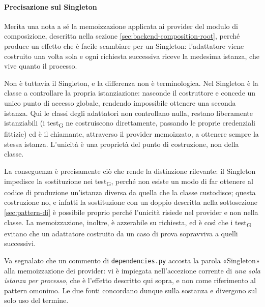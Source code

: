 \documentclass[a4paper, 10pt]{article}
\begin{document}
\paragraph{Precisazione sul Singleton}
Merita una nota a sé la memoizzazione applicata ai provider del modulo di composizione, descritta nella sezione \ref{sec:backend-composition-root}, perché produce un effetto che è facile scambiare per un Singleton: l'adattatore viene costruito una volta sola e ogni richiesta successiva riceve la medesima istanza, che vive quanto il processo.

Non è tuttavia il Singleton, e la differenza non è terminologica. Nel Singleton è la classe a controllare la propria istanziazione: nasconde il costruttore e concede un unico punto di accesso globale, rendendo impossibile ottenere una seconda istanza. Qui le classi degli adattatori non controllano nulla, restano liberamente istanziabili (i test\textsubscript{G} ne costruiscono direttamente, passando le proprie credenziali fittizie) ed è il chiamante, attraverso il provider memoizzato, a ottenere sempre la stessa istanza. L'unicità è una proprietà del punto di costruzione, non della classe.

La conseguenza è precisamente ciò che rende la distinzione rilevante: il Singleton impedisce la sostituzione nei test\textsubscript{G}, perché non esiste un modo di far ottenere al codice di produzione un'istanza diversa da quella che la classe custodisce; questa costruzione no, e infatti la sostituzione con un doppio descritta nella sottosezione \ref{sec:pattern-di} è possibile proprio perché l'unicità risiede nel provider e non nella classe. La memoizzazione, inoltre, è azzerabile su richiesta, ed è così che i test\textsubscript{G} evitano che un adattatore costruito da un caso di prova sopravviva a quelli successivi.

Va segnalato che un commento di \texttt{dependencies.py} accosta la parola «Singleton» alla memoizzazione dei provider: vi è impiegata nell'accezione corrente di \textit{una sola istanza per processo}, che è l'effetto descritto qui sopra, e non come riferimento al pattern omonimo. Le due fonti concordano dunque sulla sostanza e divergono sul solo uso del termine.
\end{document}
